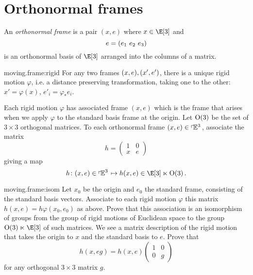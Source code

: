 \section{Orthonormal frames}
An \emph{orthonormal frame} is a pair \((x,e)\) where \(x \in \E[3]\) and 
\[
 e=\left(e_1 \ e_2 \ e_3\right)
\]
is an orthonormal basis of \(\E[3]\) arranged into the columns of a matrix.
\begin{center}
\end{center}
\begin{problem}{moving.frame:rigid}
For any two frames \((x,e), \left(x',e'\right)\), there is a unique rigid motion \(\varphi\), i.e. a distance preserving transformation, taking one to the other: \(x'=\varphi(x)\), \(e'_i=\varphi_* e_i\).
\end{problem}
Each rigid motion \(\varphi\) has associated frame \((x,e)\) which is the frame that arises when we apply \(\varphi\) to the standard basis frame at the origin.
Let \(\textrm{O}\!\left(3\right)\) be the set of \(3 \times 3\) orthogonal matrices.
To each orthonormal frame \((x,e)\in\left\ulcorner\!\mathbb{E}^{3}\right.\), associate the matrix
\[
h=
\begin{pmatrix}
1 & 0 \\
x & e
\end{pmatrix}
\]
giving a map
\[
h \colon (x,e) \in \frameBundleE{3}\mapsto h(x,e) \in \E[3] \ltimes \Orth{3}.
\]
\begin{problem}{moving.frame:isom}
Let \(x_0\) be the origin and \(e_0\) the standard frame, consisting of the standard basis vectors.
Associate to each rigid motion \(\varphi\) this matrix \(h(x,e)=h \varphi(x_0,e_0)\) as above.
Prove that this association is an isomorphism of groups from the group of rigid motions of Euclidean space to the group \(\Orth{3} \ltimes \E[3]\) of such matrices.
We see a matrix description of the rigid motion that takes the origin to \(x\) and the standard basis to \(e\).
Prove that
\[
h(x,eg)=h(x,e)
\begin{pmatrix}
1 & 0 \\
0 & g
\end{pmatrix}
\]
for any orthogonal \(3 \times 3\) matrix \(g\).
\end{problem}

